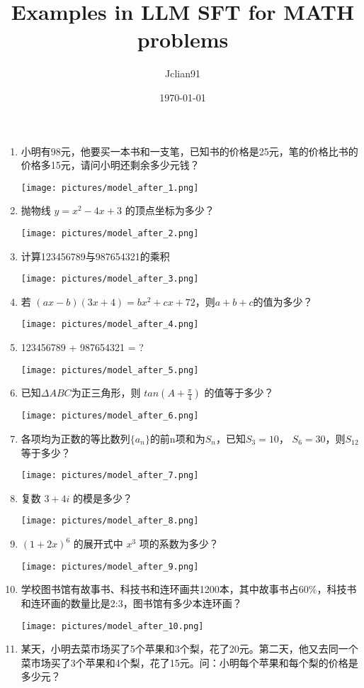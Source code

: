 \documentclass{article}
\title{Examples in LLM SFT for MATH problems}
\author{Jclian91}
\date{\today}
\begin{document}
	
	\maketitle
	
	\clearpage
	
	\begin{enumerate}
		\item 小明有98元，他要买一本书和一支笔，已知书的价格是25元，笔的价格比书的价格多15元，请问小明还剩余多少元钱？\par
			\texttt{[image: pictures/model\_after\_1.png]}
		\item 抛物线 $y=x^2 - 4x+3$ 的顶点坐标为多少？\par
				\texttt{[image: pictures/model\_after\_2.png]}
		\item 计算123456789与987654321的乘积\par
				\texttt{[image: pictures/model\_after\_3.png]}
		\item 若 $(ax-b)(3x+4)=bx^2 + cx+72$，则$a+b+c$的值为多少？\par
			\texttt{[image: pictures/model\_after\_4.png]}
		\item 123456789 + 987654321 = ?\par
			\texttt{[image: pictures/model\_after\_5.png]}
		\item 已知$\Delta ABC$为正三角形，则 $tan(A+\frac{\pi}{4})$ 的值等于多少？\par
			\texttt{[image: pictures/model\_after\_6.png]}
		\item 各项均为正数的等比数列$\{a_{n}\}$的前n项和为$S_{n}$，已知$S_{3}=10$， $S_{6}=30$，则$S_{12}$等于多少？\par
			\texttt{[image: pictures/model\_after\_7.png]}
		\item 复数 $3+4i$ 的模是多少？\par
			\texttt{[image: pictures/model\_after\_8.png]}
		\item $(1+2x)^6$ 的展开式中 $x^3$ 项的系数为多少？\par
			\texttt{[image: pictures/model\_after\_9.png]}
		\item 学校图书馆有故事书、科技书和连环画共1200本，其中故事书占60\%，科技书和连环画的数量比是2:3，图书馆有多少本连环画？\par
			\texttt{[image: pictures/model\_after\_10.png]}
		\item 某天，小明去菜市场买了5个苹果和3个梨，花了20元。第二天，他又去同一个菜市场买了3个苹果和4个梨，花了15元。问：小明每个苹果和每个梨的价格是多少元？\par

\end{enumerate}
\end{document}
